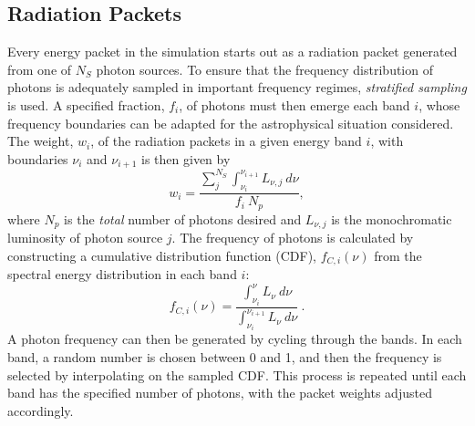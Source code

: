 \subsection{Radiation Packets}
\label{sec:packets}
Every energy packet in the simulation starts out as a radiation packet generated
from one of $N_S$ photon sources. To ensure that the frequency distribution
of photons is adequately sampled in important frequency regimes, 
{\em stratified sampling} is used. A specified fraction, $f_i$,
of photons must then emerge each band $i$, whose frequency boundaries
can be adapted for the astrophysical situation considered. 
The weight, $w_i$, of the radiation packets in a given energy band $i$, with boundaries
$\nu_i$ and $\nu_{i+1}$ is then given by
\begin{equation}
w_i = \frac{\sum_j^{N_S} \int_{\nu_i}^{\nu_{i+1}} L_{\nu,j}~d\nu}{f_i~N_p},
\end{equation}
where $N_p$ is the {\em total} number of photons desired 
and $L_{\nu,j}$ is the monochromatic 
luminosity of photon source $j$. 
The frequency of photons is calculated by constructing a 
cumulative distribution function (CDF), $f_{C,i}(\nu)$
from the spectral energy distribution in each band $i$: 
\begin{equation}
f_{C,i} (\nu) = 
\frac{\int_{\nu_i}^{\nu} L_\nu~d\nu}
{\int_{\nu_i}^{\nu_{i+1}} L_\nu~d\nu} ~.
\end{equation}
A photon frequency can then be generated by cycling through the bands. In each band,
a random number is chosen between 0 and 1, and then the frequency is 
selected by interpolating on the sampled CDF. This process is repeated until 
each band has the specified number of photons, with the packet
weights adjusted accordingly.

